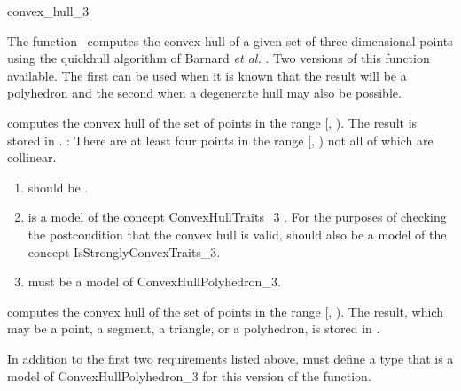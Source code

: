 \begin{ccRefFunction}{convex_hull_3}

The function \ccRefName\ computes the convex hull of a given set of 
three-dimensional points using the quickhull algorithm of Barnard
\textit{et al.} \cite{bdh-qach-96}.  Two versions of this function 
available.  The first can be used when it is known that the result
will be a polyhedron and the second when a degenerate hull
may also be possible.


{
computes the convex hull of the set of points in the range
[, ).  The result is stored in .
\ccPrecond: There are at least four points in the range 
[, ) not all of which are collinear.
}

\begin{enumerate}
   \item {} should be .
   \item {} is a model of the concept ConvexHullTraits\_3
         .
         For the purposes of checking the postcondition that the convex hull
         is valid,  should also be a model of the concept
         IsStronglyConvexTraits\_3.
  \item {} must be a model of ConvexHullPolyhedron\_3.
\end{enumerate}

{
computes the convex hull of the set of points in the range
[, ).  The result, which may be a point, a segment,
a triangle, or a polyhedron, is stored in .
}

In addition to the first two requirements listed above,  must
define a type  that is a model of ConvexHullPolyhedron\_3
for this version of the function. 


\end{ccRefFunction}
